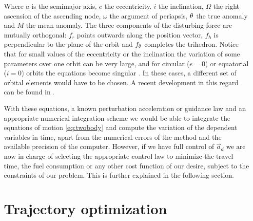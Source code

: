 Where $a$ is the semimajor axis, $e$ the eccentricity, $i$ the inclination, $\Omega$ the right ascension of the ascending node, $\omega$ the argument of periapsis, $\theta$ the true anomaly and $M$ the mean anomaly. The three components of the disturbing force are mutually orthogonal: $f_r$ points outwards along the position vector, $f_h$ is perpendicular to the plane of the orbit and $f_{\theta}$ completes the trihedron.
% 
% 
% 
% 
%
%
Notice that for small values of the eccentricity or the inclination the variation of some parameters over one orbit can be very large, and for circular ($e = 0$) or equatorial ($i = 0$) orbits the equations become singular \cite{vallado2001fundamentals}. In these cases, a different set of orbital elements would have to be chosen. A recent development in this regard can be found in \cite{bau2013new}.
% 
% 

With these equations, a known perturbation acceleration or guidance law and an appropriate numerical integration scheme we would be able to integrate the equations of motion \ref{eq:twobody} and compute the variation of the dependent variables in time, apart from the numerical errors of the method and the available precision of the computer. However, if we have full control of $\vec{a}_d$ we are now in charge of selecting the appropriate control law to minimize the travel time, the fuel consumption or any other cost function of our desire, subject to the constraints of our problem. This is further explained in the following section.
% 
% 
% 
% 

\section{Trajectory optimization}

